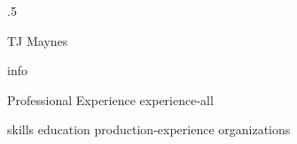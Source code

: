 \documentclass[10pt]{article}
\begin{document}
\moveleft.5\hoffset\centerline{\huge TJ Maynes}
{info}

\begin{section}{Professional Experience}
  {experience-all}
\end{section}

{skills}
{education}
{production-experience}
{organizations}
\end{document}
